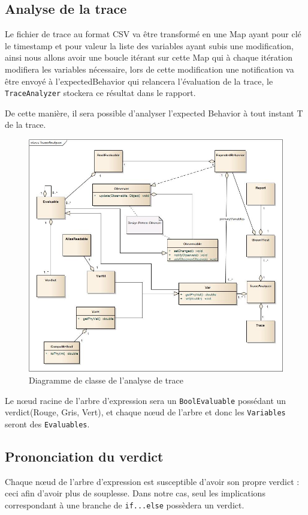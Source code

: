 	\subsection{Analyse de la trace}
	Le fichier de trace au format CSV va être transformé en une Map ayant pour clé le timestamp et pour valeur la liste des variables ayant subis une modification, ainsi nous allons avoir une boucle itérant sur cette Map qui à chaque itération modifiera les variables nécessaire, lors de cette modification une notification va être envoyé à l'expectedBehavior qui relancera l'évaluation de la trace, le \texttt{TraceAnalyzer} stockera ce résultat dans le rapport. 

	De cette manière, il sera possible d'analyser l'expected Behavior à tout instant T de la trace.
 	\begin{figure}[H]
 		\centering
 		\includegraphics[width=15.5cm]{contents/images/TraceAnalyzer.jpg}
 		\caption{Diagramme de classe de l'analyse de trace}
 		\label{fig:diagLogique}
 	\end{figure}
 	Le n\oe{}ud racine de l'arbre d'expression sera un \texttt{BoolEvaluable} possédant un verdict(Rouge, Gris, Vert), et chaque n\oe{}ud de l'arbre et donc les \texttt{Variables} seront des \texttt{Evaluables}.
	\subsection{Prononciation du verdict}
	Chaque n\oe{}ud de l'arbre d'expression est susceptible d'avoir son propre verdict : ceci afin d'avoir plus de souplesse. Dans notre cas, seul les implications correspondant à une branche de \texttt{if...else} possèdera un verdict.
